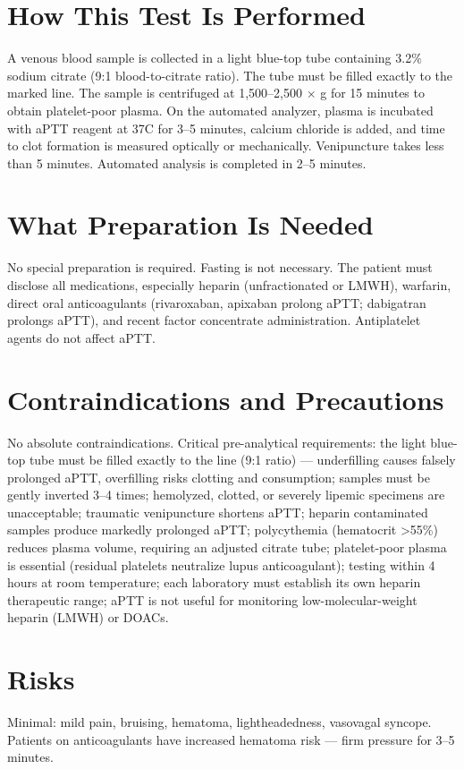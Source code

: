 \section*{How This Test Is Performed}
A venous blood sample is collected in a light blue-top tube containing 3.2\% sodium citrate (9:1 blood-to-citrate ratio). The tube must be filled exactly to the marked line. The sample is centrifuged at 1,500--2,500 $\times$ g for 15 minutes to obtain platelet-poor plasma. On the automated analyzer, plasma is incubated with aPTT reagent at 37\textdegree{}C for 3--5 minutes, calcium chloride is added, and time to clot formation is measured optically or mechanically. Venipuncture takes less than 5 minutes. Automated analysis is completed in 2--5 minutes.

\section*{What Preparation Is Needed}
No special preparation is required. Fasting is not necessary. The patient must disclose all medications, especially heparin (unfractionated or LMWH), warfarin, direct oral anticoagulants (rivaroxaban, apixaban prolong aPTT; dabigatran prolongs aPTT), and recent factor concentrate administration. Antiplatelet agents do not affect aPTT.

\section*{Contraindications and Precautions}
No absolute contraindications. Critical pre-analytical requirements: the light blue-top tube must be filled exactly to the line (9:1 ratio) --- underfilling causes falsely prolonged aPTT, overfilling risks clotting and consumption; samples must be gently inverted 3--4 times; hemolyzed, clotted, or severely lipemic specimens are unacceptable; traumatic venipuncture shortens aPTT; heparin contaminated samples produce markedly prolonged aPTT; polycythemia (hematocrit >55\%) reduces plasma volume, requiring an adjusted citrate tube; platelet-poor plasma is essential (residual platelets neutralize lupus anticoagulant); testing within 4 hours at room temperature; each laboratory must establish its own heparin therapeutic range; aPTT is not useful for monitoring low-molecular-weight heparin (LMWH) or DOACs.

\section*{Risks}
Minimal: mild pain, bruising, hematoma, lightheadedness, vasovagal syncope. Patients on anticoagulants have increased hematoma risk --- firm pressure for 3--5 minutes.

